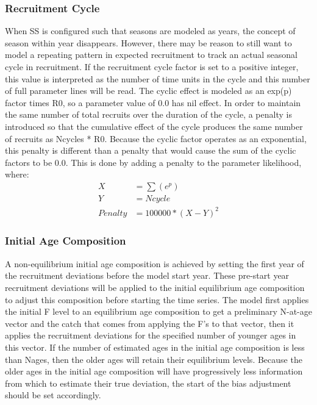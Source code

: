 \subsubsection{Recruitment Cycle}
When SS is configured such that seasons are modeled as years, the concept of season within year disappears.  However, there may be reason to still want to model a repeating pattern in expected recruitment to track an actual seasonal cycle in recruitment.  If the recruitment cycle factor is set to a positive integer, this value is interpreted as the number of time units in the cycle and this number of full parameter lines will be read.  The cyclic effect is modeled as an exp(p) factor times R0, so a parameter value of 0.0 has nil effect.  In order to maintain the same number of total recruits over the duration of the cycle, a penalty is introduced so that the cumulative effect of the cycle produces the same number of recruits as Ncycles * R0.  Because the cyclic factor operates as an exponential, this penalty is different than a penalty that would cause the sum of the cyclic factors to be 0.0.  This is done by adding a penalty to the parameter likelihood, where:
\begin{equation}
	\begin{split}
				   X & = \sum(e^p)  \\
				   Y & = Ncycle  \\
				   Penalty & = 100000*(X-Y)^2
	\end{split}
\end{equation}

\subsubsection{Initial Age Composition}
A non-equilibrium initial age composition is achieved by setting the first year of the recruitment deviations before the model start year.  These pre-start year recruitment deviations will be applied to the initial equilibrium age composition to adjust this composition before starting the time series.  The model first applies the initial F level to an equilibrium age composition to get a preliminary N-at-age vector and the catch that comes from applying the F's to that vector, then it applies the recruitment deviations for the specified number of younger ages in this vector.  If the number of estimated ages in the initial age composition is less than Nages, then the older ages will retain their equilibrium levels.  Because the older ages in the initial age composition will have progressively less information from which to estimate their true deviation, the start of the bias adjustment should be set accordingly.

